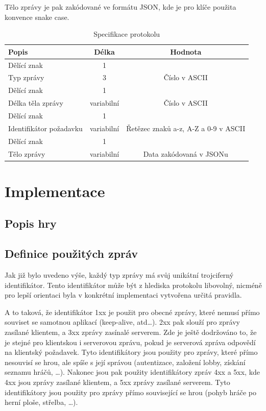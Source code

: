 \documentclass[12pt, a4paper]{article}
\begin{document}
    Tělo zprávy je pak zakódované ve formátu JSON, kde je pro klíče použita konvence snake case. 

    \begin{table}[H]
        \centering
        \begin{tabular}{|l|c|c|}
            \hline
            Popis & Délka & Hodnota\\
            \hline
            \hline
            Dělící znak & 1 & \uv{|} \\
            \hline
            Typ zprávy & 3 & Číslo v ASCII \\
            \hline
            Dělící znak & 1 & \uv{|} \\
            \hline
            Délka těla zprávy & variabilní & Číslo v ASCII \\
            \hline
            Dělící znak & 1 & \uv{|} \\
            \hline
            Identifikátor požadavku & variabilní & Řetězec znaků a-z, A-Z a 0-9 v ASCII \\
            \hline
            Dělící znak & 1 & \uv{|} \\
            \hline
            Tělo zprávy & variabilní & Data zakódovaná v JSONu \\
            \hline
        \end{tabular}
        \caption{Specifikace protokolu}
    \end{table}

    \section{Implementace}
    \subsection{Popis hry}

    \subsection{Definice použitých zpráv}
    Jak již bylo uvedeno výše, každý typ zprávy má svůj unikátní trojciferný identifikátor.
    Tento identifikátor může být z hlediska protokolu libovolný, nicméně pro lepší orientaci byla v konkrétní implementaci vytvořena určitá pravidla.
    
    A to taková, že identifikátor 1xx je použit pro obecné zprávy, které nemusí přímo souviset se samotnou aplikací (keep-alive, atd\dots).
    2xx pak slouží pro zprávy zasílané klientem, a 3xx zprávy zasínalé serverem.
    Zde je ještě dodržováno to, že  je stejné pro klientskou i serverovou zprávu, pokud je serverová zpráva odpovědí na klientský požadavek.
    Tyto identifikátory jsou použity pro zprávy, které přímo nesouvisí se hrou, ale spíše s její správou (autentizace, založení lobby, získání seznamu hráčů, \dots).
    Nakonec jsou pak použity identifikátory zpráv 4xx a 5xx, kde 4xx jsou zprávy zasílané klientem, a 5xx zprávy zasílané serverem. Tyto identifikátory jsou použity pro zprávy přímo související se hrou (pohyb hráče po herní ploše, střelba, \dots).
\end{document}
